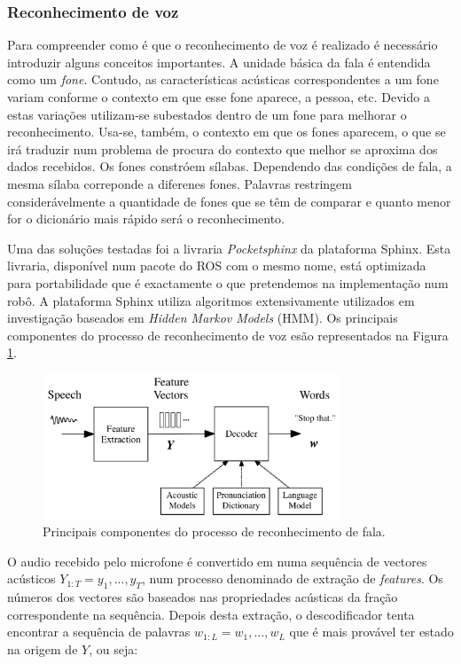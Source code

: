 \documentclass[journal]{IEEEtran}
\begin{document}
\subsubsection{Reconhecimento de voz}

Para compreender como é que o reconhecimento de voz é realizado é necessário introduzir alguns conceitos importantes. A unidade básica da fala é entendida como um \emph{fone}. Contudo, as características acústicas correspondentes a um fone variam conforme o contexto em que esse fone aparece, a pessoa, etc. Devido a estas variações  utilizam-se subestados dentro de um fone para melhorar o reconhecimento. Usa-se, também, o contexto em que os fones aparecem, o que se irá traduzir num problema de procura do contexto que melhor se aproxima dos dados recebidos. Os fones constróem sílabas. Dependendo das condições de fala, a mesma sílaba correponde a diferenes fones. Palavras restringem considerávelmente a quantidade de fones que se têm de comparar e quanto menor for o dicionário mais rápido será o reconhecimento.

Uma das soluções testadas foi a livraria \textit{Pocketsphinx} da plataforma Sphinx. Esta livraria, disponível num pacote do ROS com o mesmo nome, está optimizada para portabilidade que é exactamente o que pretendemos na implementação num robô. A plataforma Sphinx utiliza algoritmos extensivamente utilizados em investigação baseados em \textit{Hidden Markov Models} (HMM). Os principais componentes do processo de reconhecimento de voz esão representados na Figura \ref{fig:voicerecprocess}.

\begin{figure}[ht]
  \centering
  \includegraphics[width=21pc]{voice_rec_process.png}
  \caption{Principais componentes do processo de reconhecimento de fala.}
  \label{fig:voicerecprocess}
\end{figure}

O audio recebido pelo microfone é convertido em numa sequência de vectores acústicos $Y_{1:T}=y_1,...,y_T$, num processo denominado de extração de \textit{features}. Os números dos vectores são baseados nas propriedades acústicas da fração correspondente na sequência. Depois desta extração, o descodificador tenta encontrar a sequência de palavras $w_{1:L}=w_1,...,w_L$ que é mais provável ter estado na origem de $Y$, ou seja:
\end{document}
